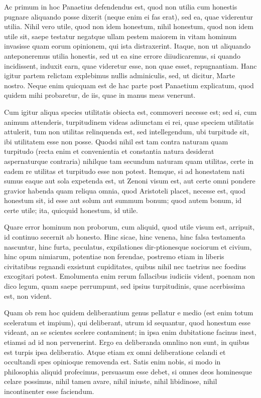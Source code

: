  Ac primum in hoc Panaetius defendendus est, quod non utilia cum honestis pugnare aliquando posse dixerit (neque enim ei fas erat), sed ea, quae viderentur utilia. Nihil vero utile, quod non idem honestum, nihil honestum, quod non idem utile sit, saepe testatur negatque ullam pestem maiorem in vitam hominum invasisse quam eorum opinionem, qui ista distraxerint. Itaque, non ut aliquando anteponeremus utilia honestis, sed ut ea sine errore diiudicaremus, si quando incidissent, induxit earn, quae videretur esse, non quae esset, repugnantiam. Hanc igitur partem relictam explebimus nullis adminiculis, sed, ut dicitur, Marte nostro. Neque enim quicquam est de hac parte post Panaetium explicatum, quod quidem mihi probaretur, de iis, quae in manus meas venerunt.

 Cum igitur aliqua species utilitatis obiecta est, commoveri necesse est; sed si, cum animum attenderis, turpitudinem videas adiunctam ei rei, quae speciem utilitatis attulerit, tum non utilitas relinquenda est, sed intellegendum, ubi turpitude sit, ibi utilitatem esse non posse. Quodsi nihil est tam contra naturam quam turpitudo (recta enim et convenientia et constantia natura desiderat aspernaturque contraria) nihilque tam secundum naturam quam utilitas, certe in eadem re utilitas et turpitudo esse non potest. Itemque, si ad honestatem nati sumus eaque aut sola expetenda est, ut Zenoni visum est, aut certe omni pondere gravior habenda quam reliqua omnia, quod Aristoteli placet, necesse est, quod honestum sit, id esse aut solum aut summum bonum; quod autem bonum, id certe utile; ita, quicquid honestum, id utile.

 Quare error hominum non proborum, cum aliquid, quod utile visum est, arripuit, id continuo secernit ab honesto. Hinc sicae, hinc venena, hinc falsa testamenta nascuntur, hinc furta, peculatus, expilationes dir-ptionesque sociorum et civium, hinc opum nimiarum, potentiae non ferendae, postremo etiam in liberis civitatibus regnandi exsistunt cupiditates, quibus nihil nec taetrius nec foedius excogitari potest. Emolumenta enim rerum fallacibus iudiciis vident, poenam non dico legum, quam saepe perrumpunt, sed ipsius turpitudinis, quae acerbissima est, non vident.

 Quam ob rem hoc quidem deliberantium genus pellatur e medio (est enim totum sceleratum et impium), qui deliberant, utrum id sequantur, quod honestum esse videant, an se scientes scelere contaminent; in ipsa enim dubitatione facinus inest, etiamsi ad id non pervenerint. Ergo ea deliberanda omnlino non sunt, in quibus est turpis ipsa deliberatio. Atque etiam ex omni deliberatione celandi et occultandi spes opinioque removenda est. Satis enim nobis, si modo in philosophia aliquid profecimus, persuasum esse debet, si omnes deos hominesque celare possimus, nihil tamen avare, nihil iniuste, nihil libidinose, nihil incontinenter esse faciendum.

